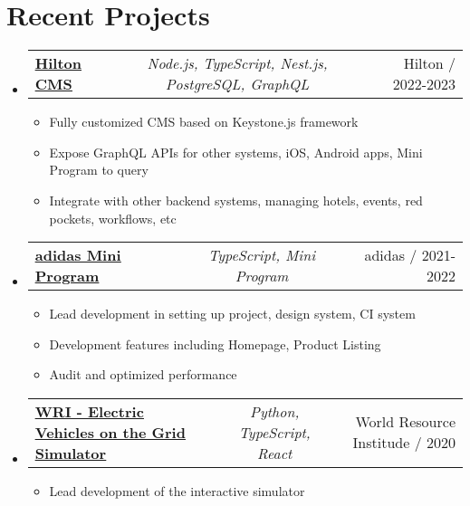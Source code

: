 \documentclass[a4paper,11pt]{article}
\makeatletter
\newcommand{\resumeItem}[1]{
  \item\small{#1}
}
\newcommand{\resumeItemListStart}{\begin{itemize}[rightmargin=0.11in]}
\newcommand{\resumeItemListEnd}{\end{itemize}}
\newcommand{\resumeTrioHeading}[3]{
  \item\small{
    \begin{tabular*}{0.96\textwidth}[t]{
      l@{\extracolsep{\fill}}c@{\extracolsep{\fill}}r
    }
      \textbf{#1} & \textit{#2} & #3
    \end{tabular*}
  }
}
\newcommand{\resumeHeadingListStart}{
  \begin{itemize}[leftmargin=0.15in, label={}]
}
\newcommand{\resumeHeadingListEnd}{\end{itemize}}
\makeatother
\begin{document}
\section{Recent Projects}
  \resumeHeadingListStart{}
      \resumeTrioHeading{\href{https://digital-cms.hilton.com.cn/control-panel}{\uline{Hilton CMS}}}{Node.js, TypeScript, Nest.js, PostgreSQL, GraphQL}{Hilton / 2022-2023}
      \resumeItemListStart{}
        \resumeItem{Fully customized CMS based on Keystone.js framework}
        \resumeItem{Expose GraphQL APIs for other systems, iOS, Android apps, Mini Program to query}
        \resumeItem{Integrate with other backend systems, managing hotels, events, red pockets, workflows, etc}
      \resumeItemListEnd{}

    \resumeTrioHeading{\href{https://adidas.com/}{\uline{adidas Mini Program}}}{TypeScript, Mini Program}{adidas / 2021-2022}
      \resumeItemListStart{}
        \resumeItem{Lead development in setting up project, design system, CI system}
        \resumeItem{Development features including Homepage, Product Listing}
        \resumeItem{Audit and optimized performance}
      \resumeItemListEnd{}

    \resumeTrioHeading{\href{https://www.wri.org/data/electric-vehicles-grid-simulator}{\uline{WRI - Electric Vehicles on the Grid Simulator}}}{Python, TypeScript, React}{World Resource Institude / 2020}
      \resumeItemListStart{}
        \resumeItem{Lead development of the interactive simulator}
      \resumeItemListEnd{}
  \resumeHeadingListEnd{}
\end{document}
